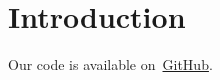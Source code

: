 \section{Introduction}
\label{sec:intro}
Our code is available on~\href{https://github.com/balthazarneveu/molecule-retrieval-using-nlp}{GitHub}.


